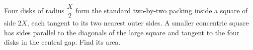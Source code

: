 Four disks of radius $\dfrac{X}{2}$ form the standard two-by-two packing inside a square of side $2X$, each tangent to its two nearest outer sides. A smaller concentric square has sides parallel to the diagonals of the large square and tangent to the four disks in the central gap. Find its area.
